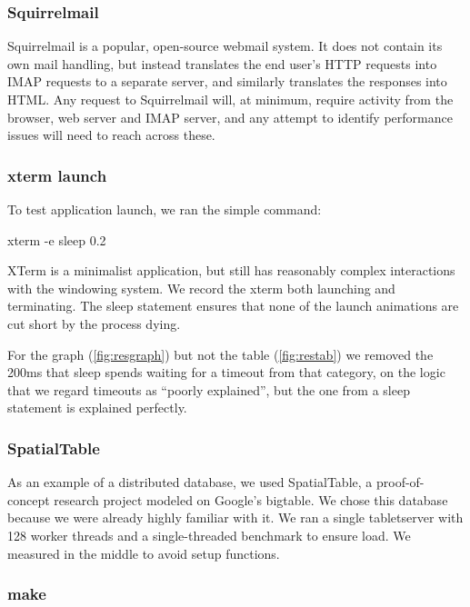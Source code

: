 \documentclass[10pt]{article}
\begin{document}
\subsubsection{Squirrelmail}

Squirrelmail\cite{Squirrelmail} is a popular, open-source webmail system.  It does not contain its own mail handling, but instead translates the end user's HTTP requests into IMAP requests to a separate server, and similarly translates the responses into HTML.  Any request to Squirrelmail will, at minimum, require activity from the browser, web server and IMAP server, and any attempt to identify performance issues will need to reach across these.

\subsubsection{xterm launch}

To test application launch, we ran the simple command:

\begin{tt} xterm -e sleep 0.2 \end{tt}

XTerm is a minimalist application, but still has reasonably complex interactions with the windowing system.  We record the xterm both launching and terminating.  The sleep statement ensures that none of the launch animations are cut short by the process dying.

For the graph (\ref{fig:resgraph}) but not the table (\ref{fig:restab}) we removed the 200ms that sleep spends waiting for a timeout from that category, on the logic that we regard timeouts as ``poorly explained'', but the one from a sleep statement is explained perfectly.

\subsubsection{SpatialTable}

As an example of a distributed database, we used SpatialTable\cite{SpatialTable}, a proof-of-concept research project modeled on Google's bigtable\cite{bigtable}.  We chose this data\-base because we were already highly familiar with it.  We ran a single tabletserver with 128 worker threads and a single-threaded benchmark to ensure load.  We measured in the middle to avoid setup functions.

\subsubsection{make}
\end{document}
